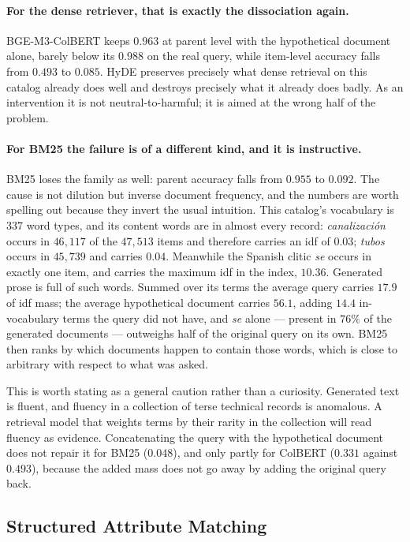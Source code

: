 \documentclass[preprint,review,12pt]{elsarticle}
\begin{document}
\paragraph{For the dense retriever, that is exactly the dissociation again.}
BGE-M3-ColBERT keeps $0.963$ at parent level with the hypothetical document alone, barely below its $0.988$ on the real query, while item-level accuracy falls from $0.493$ to $0.085$. HyDE preserves precisely what dense retrieval on this catalog already does well and destroys precisely what it already does badly. As an intervention it is not neutral-to-harmful; it is aimed at the wrong half of the problem.

\paragraph{For BM25 the failure is of a different kind, and it is instructive.}
BM25 loses the family as well: parent accuracy falls from $0.955$ to $0.092$. The cause is not dilution but inverse document frequency, and the numbers are worth spelling out because they invert the usual intuition. This catalog's vocabulary is $337$ word types, and its content words are in almost every record: \textit{canalización} occurs in $46{,}117$ of the $47{,}513$ items and therefore carries an idf of $0.03$; \textit{tubos} occurs in $45{,}739$ and carries $0.04$. Meanwhile the Spanish clitic \textit{se} occurs in exactly one item, and carries the maximum idf in the index, $10.36$. Generated prose is full of such words. Summed over its terms the average query carries $17.9$ of idf mass; the average hypothetical document carries $56.1$, adding $14.4$ in-vocabulary terms the query did not have, and \textit{se} alone --- present in $76\%$ of the generated documents --- outweighs half of the original query on its own. BM25 then ranks by which documents happen to contain those words, which is close to arbitrary with respect to what was asked.

This is worth stating as a general caution rather than a curiosity. Generated text is fluent, and fluency in a collection of terse technical records is anomalous. A retrieval model that weights terms by their rarity in the collection will read fluency as evidence. Concatenating the query with the hypothetical document does not repair it for BM25 ($0.048$), and only partly for ColBERT ($0.331$ against $0.493$), because the added mass does not go away by adding the original query back.

\subsection{Structured Attribute Matching}
\label{subsec:structured_results}
\end{document}
